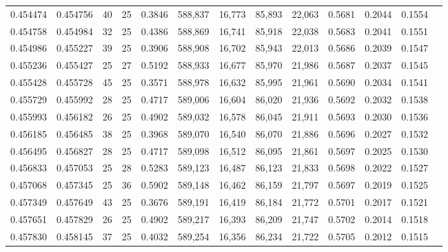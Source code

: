 \begin{tabular}{rrrrrrrrrrrrr}
0.454474 & 0.454756 &    40 &  25 &                                     0.3846 & 588,837 &  16,773 &  85,893 &  22,063 & 0.5681 & 0.2044 & 0.1554 \\
0.454758 & 0.454984 &    32 &  25 &                                     0.4386 & 588,869 &  16,741 &  85,918 &  22,038 & 0.5683 & 0.2041 & 0.1551 \\
0.454986 & 0.455227 &    39 &  25 &                                     0.3906 & 588,908 &  16,702 &  85,943 &  22,013 & 0.5686 & 0.2039 & 0.1547 \\
0.455236 & 0.455427 &    25 &  27 &                                     0.5192 & 588,933 &  16,677 &  85,970 &  21,986 & 0.5687 & 0.2037 & 0.1545 \\
0.455428 & 0.455728 &    45 &  25 &                                     0.3571 & 588,978 &  16,632 &  85,995 &  21,961 & 0.5690 & 0.2034 & 0.1541 \\
0.455729 & 0.455992 &    28 &  25 &                                     0.4717 & 589,006 &  16,604 &  86,020 &  21,936 & 0.5692 & 0.2032 & 0.1538 \\
0.455993 & 0.456182 &    26 &  25 &                                     0.4902 & 589,032 &  16,578 &  86,045 &  21,911 & 0.5693 & 0.2030 & 0.1536 \\
0.456185 & 0.456485 &    38 &  25 &                                     0.3968 & 589,070 &  16,540 &  86,070 &  21,886 & 0.5696 & 0.2027 & 0.1532 \\
0.456495 & 0.456827 &    28 &  25 &                                     0.4717 & 589,098 &  16,512 &  86,095 &  21,861 & 0.5697 & 0.2025 & 0.1530 \\
0.456833 & 0.457053 &    25 &  28 &                                     0.5283 & 589,123 &  16,487 &  86,123 &  21,833 & 0.5698 & 0.2022 & 0.1527 \\
0.457068 & 0.457345 &    25 &  36 &                                     0.5902 & 589,148 &  16,462 &  86,159 &  21,797 & 0.5697 & 0.2019 & 0.1525 \\
0.457349 & 0.457649 &    43 &  25 &                                     0.3676 & 589,191 &  16,419 &  86,184 &  21,772 & 0.5701 & 0.2017 & 0.1521 \\
0.457651 & 0.457829 &    26 &  25 &                                     0.4902 & 589,217 &  16,393 &  86,209 &  21,747 & 0.5702 & 0.2014 & 0.1518 \\
0.457830 & 0.458145 &    37 &  25 &                                     0.4032 & 589,254 &  16,356 &  86,234 &  21,722 & 0.5705 & 0.2012 & 0.1515 \\

\end{tabular}
